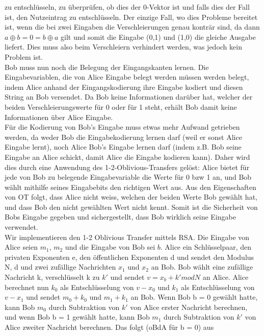 \documentclass{article}
\begin{document}
zu entschl\"usseln, zu \"uberpr\"ufen, ob dies der 0-Vektor ist und falls dies
der Fall ist, den Nutzeintrag zu entschl\"usseln. Der einzige Fall, wo dies
Probleme bereitet ist, wenn die bei zwei Eingaben die Verschleierungen 
genau kontr\"ar sind, da dann \(a \oplus b = 0 = b \oplus a\) gilt
und somit die Eingabe (0,1) und (1,0) die gleiche Ausgabe liefert. Dies
muss also beim Verschleiern verhindert werden, was jedoch kein Problem ist.\\
Bob muss nun noch die Belegung der Eingangskanten lernen. Die
Eingabevariablen, die von Alice Eingabe belegt werden m\"ussen werden
belegt, indem Alice anhand der Eingangskodierung ihre Eingabe kodiert
und diesen String an Bob versendet. Da Bob keine Informationen dar\"uber
hat, welcher der beiden Verschleierungswerte f\"ur 0 oder f\"ur 1 steht,
erh\"alt Bob damit keine Informationen \"uber Alice Eingabe.\\
F\"ur die Kodierung von Bob's Eingabe muss etwas mehr Aufwand getrieben
werden, da weder Bob die Eingabekodierung lernen darf (weil er sonst
Alice Eingabe lernt), noch Alice Bob's Eingabe lernen darf (indem z.B.
Bob seine Eingabe an Alice schickt, damit Alice die Eingabe kodieren kann).
Daher wird dies durch eine Anwendung des 1-2-Oblivious-Transfers gel\"ost:
Alice bietet f\"ur jede von Bob zu belegende Eingabevariable die Werte
f\"ur 0 bzw 1 an, und Bob w\"ahlt mithilfe seines Eingabebits den richtigen
Wert aus. Aus den Eigenschaften von OT folgt, dass Alice nicht weiss, welchen
der beiden Werte Bob gew\"ahlt hat, und dass Bob den nicht gew\"ahlten Wert
nicht kennt. Somit ist die Sicherheit von Bobs Eingabe gegeben und 
sichergestellt, dass Bob wirklich seine Eingabe verwendet.\\
Wir implementieren den 1-2 Oblivious Transfer mittels RSA. Die Eingabe
von Alice seien \(m_1\), \(m_2\) und die Eingabe von Bob sei \(b\).
Alice ein Schl\"usselpaar, den privaten Exponenten e, den
\"offentlichen Exponenten d und sendet den Modulus N, d und zwei zuf\"allige
Nachrichten \(x_1\) und \(x_2\) an Bob. Bob w\"ahlt eine zuf\"allige Nachricht
k, verschl\"usselt k zu \(k'\) und sendet \(v = x_b + k' mod N\) an Alice. 
Alice berechnet nun \(k_0\) als Entschl\"usselung von \(v - x_0\) und 
\(k_1\) als Entschl\"usselung von \(v - x_1\) und sendet \(m_0 + k_0\) und
\(m_1 + k_1\) an Bob. Wenn Bob b = 0 gew\"ahlt hatte, kann Bob \(m_0\)
durch Subtraktion von \(k'\) von Alice erster Nachricht berechnen, und wenn
Bob b = 1 gew\"ahlt hatte, kann Bob \(m_1\) durch Subtraktion von \(k'\) von
Alice zweiter Nachricht berechnen. Das folgt (oBdA f\"ur b = 0) aus
\end{document}
